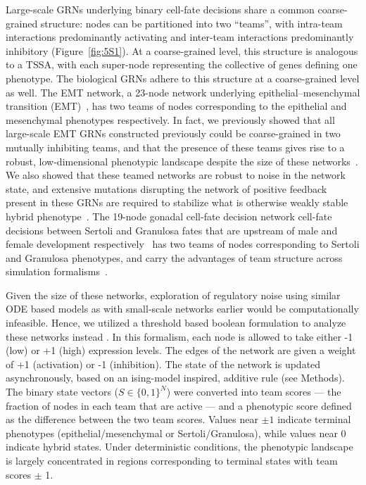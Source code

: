 \documentclass[11pt]{article}
\begin{document}
Large-scale GRNs underlying binary cell-fate decisions share a common coarse-grained structure: nodes can be partitioned into two ``teams'', with intra-team interactions predominantly activating and inter-team interactions predominantly inhibitory (Figure~\ref{fig:5S1}). At a coarse-grained level, this structure is analogous to a TSSA, with each super-node representing the collective of genes defining one phenotype. The biological GRNs adhere to this structure at a coarse-grained level as well. The EMT network, a 23-node network underlying epithelial--mesenchymal transition (EMT)~\cite{Huang2017}, has two teams of nodes corresponding to the epithelial and mesenchymal phenotypes respectively. In fact, we previously showed that all large-scale EMT GRNs constructed previously could be coarse-grained in two mutually inhibiting teams, and that the presence of these teams gives rise to a robust, low-dimensional phenotypic landscape despite the size of these networks~\cite{hari2022landscape, Hari2025LowNetworks}. We also showed that these teamed networks are robust to noise in the network state, and extensive mutations disrupting the network of positive feedback present in these GRNs are required to stabilize what is otherwise weakly stable hybrid phenotype~\cite{rashid2022network, Hari2025APlasticity}. The 19-node gonadal cell-fate decision network cell-fate decisions between Sertoli and Granulosa fates that are upstream of male and female development respectively~\cite{rios2015boolean} has two teams of nodes corresponding to Sertoli and Granulosa phenotypes, and carry the advantages of team structure across simulation formalisms~\cite{Hari2025LowNetworks, Shyam2025MutuallyNetworks}.

Given the size of these networks, exploration of regulatory noise using similar ODE based models as with small-scale networks earlier would be computationally infeasible. Hence, we utilized a threshold based boolean formulation to analyze these networks instead \cite{FontClos2018}. In this formalism, each node is allowed to take either -1 (low) or +1 (high) expression levels. The edges of the network are given a weight of +1 (activation) or -1 (inhibition). The state of the network is updated asynchronously, based on an ising-model inspired, additive rule (see Methods). The binary state vectors ($S \in \{0, 1\}^N$) were converted into team scores --- the fraction of nodes in each team that are active --- and a phenotypic score defined as the difference between the two team scores. Values near $\pm 1$ indicate terminal phenotypes (epithelial/mesenchymal or Sertoli/Granulosa), while values near 0 indicate hybrid states. Under deterministic conditions, the phenotypic landscape is largely concentrated in regions corresponding to terminal states with team scores $\pm$ 1. 
\end{document}
